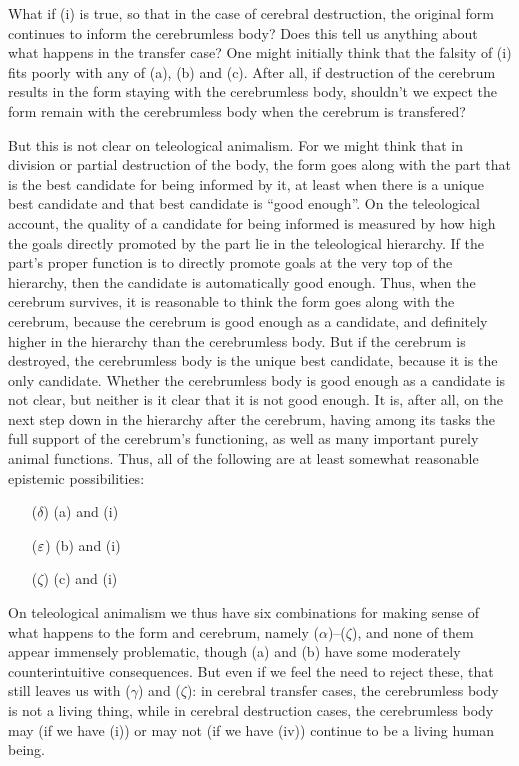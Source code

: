 What if (i) is true, so that in the case of cerebral destruction, the original form continues to inform the cerebrumless body? 
Does this  tell us anything about what happens in the transfer case? One might initially think that the falsity of (i) fits
poorly with any of (a), (b) and (c). After all, if destruction of the cerebrum results in the form staying with the cerebrumless
body, shouldn't we expect the form remain with the cerebrumless body when the cerebrum is transfered?

But this is not clear on teleological animalism. For we might think that in division or partial destruction of the body, the form 
goes along with the part that is the best candidate for being informed by it, at least when there is a unique best candidate and that best 
candidate is ``good enough''. On the teleological account, the quality of a candidate for being informed is measured 
by how high the goals directly promoted by the part lie in the teleological hierarchy. If the part's
proper function is to directly promote goals at the very top of the hierarchy, then the candidate is automatically
good enough. Thus, when the cerebrum survives, it is reasonable to think the form goes along with the cerebrum, because the cerebrum
is good enough as a candidate, and definitely higher in the hierarchy than the cerebrumless body. But if the cerebrum is destroyed, the cerebrumless
body is the unique best candidate, because it is the only candidate. Whether the cerebrumless body is good enough as a candidate is not clear, but neither is it
clear that it is not good enough. It is, after all, on the next step down in the hierarchy after the cerebrum, having among its tasks the full
support of the cerebrum's functioning, as well as many important purely animal functions. Thus, all of the following are at least somewhat reasonable 
epistemic possibilities:
\begin{itemize}
\item[($\delta$)] (a) and (i)
\item[($\varepsilon$)] (b) and (i)
\item[($\zeta$)] (c) and (i)
\end{itemize}

On teleological animalism we thus have six combinations for making sense of what happens to the form and cerebrum, namely ($\alpha$)--($\zeta$), 
and none of them appear immensely problematic, though (a) and (b) have some moderately counterintuitive consequences. But even if we feel
the need to reject these, that still leaves us with ($\gamma$) and ($\zeta$): in cerebral transfer cases, the cerebrumless body is not a living
thing, while in cerebral destruction cases, the cerebrumless body may (if we have (i)) or may not (if we have (iv)) continue to be a living
human being. 

